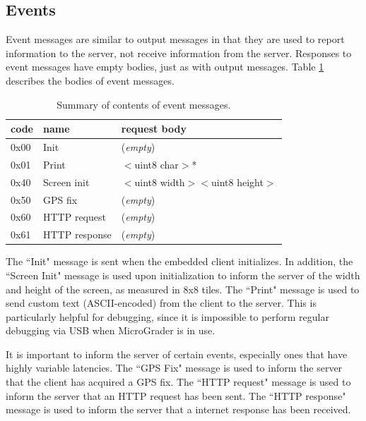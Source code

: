 \documentclass[12pt]{article}
\begin{document}
\begin{appendices}
\subsection{Events}
\label{sec:event-messages}
Event messages are similar to output messages in that they are used to report information to the server, not receive information from the server.  Responses to event messages have empty bodies, just as with output messages.  Table \ref{table:event-messages} describes the bodies of event messages.

\begin{table}[ht]
\begin{center}
\begin{tabular}{l l l}
code & name & request body \\ \hline
0x00 & Init & (\textit{empty}) \\
0x01 & Print & $<$uint8 char$>$* \\
0x40 & Screen init & $<$uint8 width$>$$<$uint8 height$>$ \\
0x50 & GPS fix & (\textit{empty}) \\
0x60 & HTTP request & (\textit{empty}) \\
0x61 & HTTP response & (\textit{empty}) \\ \hline
\end{tabular}
\caption{Summary of contents of event messages.}
\label{table:event-messages}
\end{center}
\end{table}

The ``Init" message is sent when the embedded client initializes.  In addition, the ``Screen Init" message is used upon initialization to inform the server of the width and height of the screen, as measured in 8x8 tiles.  The ``Print" message is used to send custom text (ASCII-encoded) from the client to the server.  This is particularly helpful for debugging, since it is impossible to perform regular debugging via USB when MicroGrader is in use.

It is important to inform the server of certain events, especially ones that have highly variable latencies.  The ``GPS Fix" message is used to inform the server that the client has acquired a GPS fix.  The ``HTTP request" message is used to inform the server that an HTTP request has been sent.  The ``HTTP response" message is used to inform the server that a internet response has been received.

\clearpage

\end{appendices}
\end{document}
